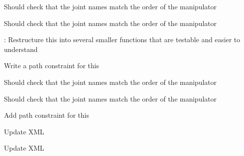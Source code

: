 
\begin{DoxyRefList}
\item[Member \mbox{\hyperlink{namespacetesseract__planning_a5479a76ec33cda8924d0e54d336e5ccc}{tesseract\+\_\+planning\+::Default\+Descartes\+Problem\+Generator}} (const std\+::string \&name, const \mbox{\hyperlink{structtesseract__planning_1_1PlannerRequest}{Planner\+Request}} \&request, const Descartes\+Plan\+Profile\+Map$<$ Float\+Type $>$ \&plan\+\_\+profiles)]\label{todo__todo000005}%
%
Should check that the joint names match the order of the manipulator 

\label{todo__todo000006}%
%
Should check that the joint names match the order of the manipulator  
\item[Member \mbox{\hyperlink{namespacetesseract__planning_aad1ed7198d10eba864130666e92d9b1f}{tesseract\+\_\+planning\+::Default\+Trajopt\+Ifopt\+Problem\+Generator}} (const std\+::string \&name, const \mbox{\hyperlink{structtesseract__planning_1_1PlannerRequest}{Planner\+Request}} \&request, const Traj\+Opt\+Ifopt\+Plan\+Profile\+Map \&plan\+\_\+profiles, const Traj\+Opt\+Ifopt\+Composite\+Profile\+Map \&composite\+\_\+profiles)]\label{todo__todo000037}%
%
\+: Restructure this into several smaller functions that are testable and easier to understand 

\label{todo__todo000038}%
%
Write a path constraint for this 

\label{todo__todo000041}%
%
Should check that the joint names match the order of the manipulator 

\label{todo__todo000040}%
%
Should check that the joint names match the order of the manipulator 

\label{todo__todo000039}%
%
Add path constraint for this  
\item[Member \mbox{\hyperlink{classtesseract__planning_1_1DescartesDefaultPlanProfile_a8bbf9dd170dfc5da44f4117d74ca7a6a}{tesseract\+\_\+planning\+::Descartes\+Default\+Plan\+Profile$<$ Float\+Type $>$\+::Descartes\+Default\+Plan\+Profile}} (const tinyxml2\+::\+XMLElement \&xml\+\_\+element)]\label{todo__todo000002}%
%
Update XML 

\label{todo__todo000001}%
%
Update XML 


\end{DoxyRefList}
